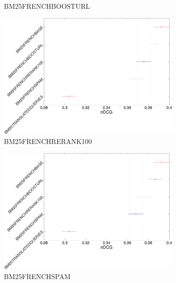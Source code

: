 \begin{figure}[tb]
\begin{subfigure}[b]{0.49\textwidth}
         \caption{BM25FRENCHBOOSTURL}
         \label{fig:sthsd2}
     \end{subfigure}
     \hfill
     \begin{subfigure}[b]{0.49\textwidth}
         \centering
         \includegraphics[width=\textwidth]{figure/shortterm/tukeyhsd-3.png}
         \caption{BM25FRENCHRERANK100}
         \label{fig:sthsd3}
     \end{subfigure}
     \begin{subfigure}[b]{0.49\textwidth}
         \centering
         \includegraphics[width=\textwidth]{figure/shortterm/tukeyhsd-4.png}
         \caption{BM25FRENCHSPAM}
         \label{fig:sthsd4}
     \end{subfigure}
     \begin{subfigure}[b]{0.49\textwidth}
         \centering

\end{subfigure}
\end{figure}
